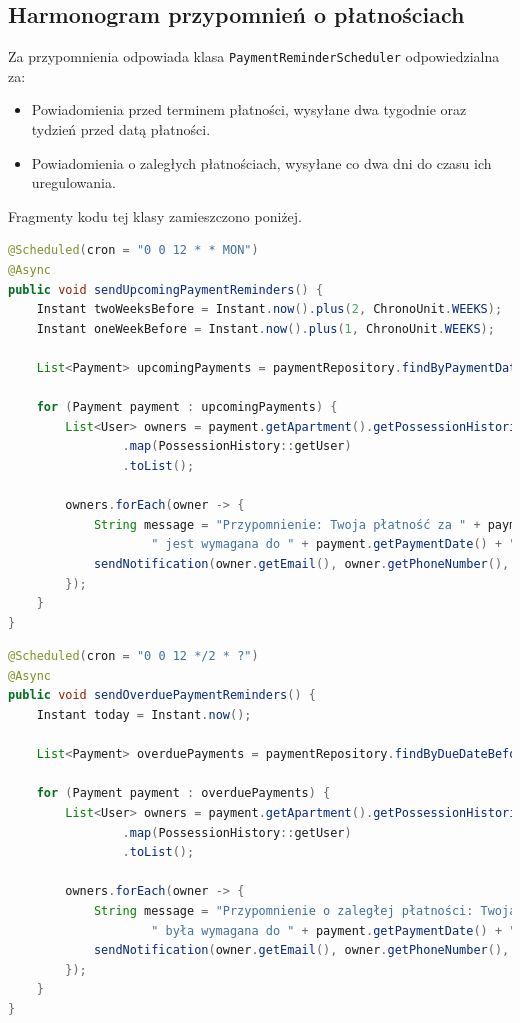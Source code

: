 \subsection{Harmonogram przypomnień o płatnościach}
Za przypomnienia odpowiada klasa \texttt{PaymentReminderScheduler} odpowiedzialna za:
\begin{itemize}
    \item Powiadomienia przed terminem płatności, wysyłane dwa tygodnie oraz tydzień przed datą płatności.
    \item Powiadomienia o zaległych płatnościach, wysyłane co dwa dni do czasu ich uregulowania.
\end{itemize}
Fragmenty kodu tej klasy zamieszczono poniżej.
\begin{lstlisting}[language=Java, style=JavaStyle, caption=Przypomnienie o nadchodzących płatnościach]
@Scheduled(cron = "0 0 12 * * MON")
@Async
public void sendUpcomingPaymentReminders() {
    Instant twoWeeksBefore = Instant.now().plus(2, ChronoUnit.WEEKS);
    Instant oneWeekBefore = Instant.now().plus(1, ChronoUnit.WEEKS);

    List<Payment> upcomingPayments = paymentRepository.findByPaymentDateBetween(twoWeeksBefore, oneWeekBefore);

    for (Payment payment : upcomingPayments) {
        List<User> owners = payment.getApartment().getPossessionHistories().stream()
                .map(PossessionHistory::getUser)
                .toList();

        owners.forEach(owner -> {
            String message = "Przypomnienie: Twoja płatność za " + payment.getDescription() +
                    " jest wymagana do " + payment.getPaymentDate() + ".";
            sendNotification(owner.getEmail(), owner.getPhoneNumber(), message);
        });
    }
}
\end{lstlisting}

\begin{lstlisting}[language=Java, style=JavaStyle, caption=Przypomnienie o zaległych płatnościach]
@Scheduled(cron = "0 0 12 */2 * ?")
@Async
public void sendOverduePaymentReminders() {
    Instant today = Instant.now();

    List<Payment> overduePayments = paymentRepository.findByDueDateBeforeAndIsPaidFalse(today);

    for (Payment payment : overduePayments) {
        List<User> owners = payment.getApartment().getPossessionHistories().stream()
                .map(PossessionHistory::getUser)
                .toList();

        owners.forEach(owner -> {
            String message = "Przypomnienie o zaległej płatności: Twoja płatność za " + payment.getDescription() +
                    " była wymagana do " + payment.getPaymentDate() + ". Prosimy o dokonanie płatności jak najszybciej.";
            sendNotification(owner.getEmail(), owner.getPhoneNumber(), message);
        });
    }
}
\end{lstlisting}

